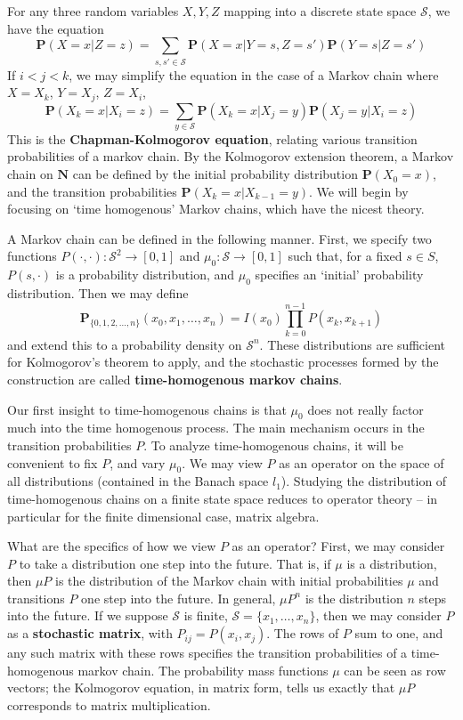 For any three random variables $X,Y,Z$ mapping into a discrete state space $\mathcal{S}$, we have the equation
%
\[ \mathbf{P}(X = x | Z = z) = \sum_{s,s' \in \mathcal{S}} \mathbf{P}(X = x | Y = s, Z = s') \mathbf{P}(Y = s | Z = s') \]
%
If $i < j < k$, we may simplify the equation in the case of a Markov chain where $X = X_k$, $Y = X_j$, $Z = X_i$,
%
\[ \mathbf{P}(X_k = x | X_i = z) = \sum_{y \in \mathcal{S}} \mathbf{P}(X_k = x | X_j = y) \mathbf{P}(X_j = y | X_i = z) \]
%
This is the {\bf Chapman-Kolmogorov equation}, relating various transition probabilities of a markov chain. By the Kolmogorov extension theorem, a Markov chain on $\mathbf{N}$ can be defined by the initial probability distribution $\mathbf{P}(X_0 = x)$, and the transition probabilities $\mathbf{P}(X_k = x | X_{k - 1} = y)$. We will begin by focusing on `time homogenous' Markov chains, which have the nicest theory.

\begin{definition}
    A Markov chain can be defined in the following manner. First, we specify two functions $P(\cdotp,\cdotp):\mathcal S^2 \to [0,1]$ and $\mu_0: \mathcal S \to [0,1]$ such that, for a fixed $s \in S$, $P(s,\cdot)$ is a probability distribution, and $\mu_0$ specifies an `initial' probability distribution. Then we may define
    \[ \mathbf{P}_{\{0, 1, 2, \dots, n\}}(x_0, x_1, \dots, x_n) = I(x_0) \prod_{k = 0}^{n-1} P(x_k,x_{k+1}) \]
    and extend this to a probability density on $\mathcal S^n$. These distributions are sufficient for Kolmogorov's theorem to apply, and the stochastic processes formed by the construction are called {\bf time-homogenous markov chains}.
\end{definition}

Our first insight to time-homogenous chains is that $\mu_0$ does not really factor much into the time homogenous process. The main mechanism occurs in the transition probabilities $P$. To analyze time-homogenous chains, it will be convenient to fix $P$, and vary $\mu_0$. We may view $P$ as an operator on the space of all distributions (contained in the Banach space $l_1$). Studying the distribution of time-homogenous chains on a finite state space reduces to operator theory -- in particular for the finite dimensional case, matrix algebra.

What are the specifics of how we view $P$ as an operator? First, we may consider $P$ to take a distribution one step into the future. That is, if $\mu$ is a distribution, then $\mu P$ is the distribution of the Markov chain with initial probabilities $\mu$ and transitions $P$ one step into the future. In general, $\mu P^n$ is the distribution $n$ steps into the future. If we suppose $\mathcal{S}$ is finite, $\mathcal{S} = \{ x_1, \dots, x_n \}$, then we may consider $P$ as a {\bf stochastic matrix}, with $P_{ij} = P(x_i,x_j)$. The rows of $P$ sum to one, and any such matrix with these rows specifies the transition probabilities of a time-homogenous markov chain. The probability mass functions $\mu$ can be seen as row vectors; the Kolmogorov equation, in matrix form, tells us exactly that $\mu P$ corresponds to matrix multiplication.



